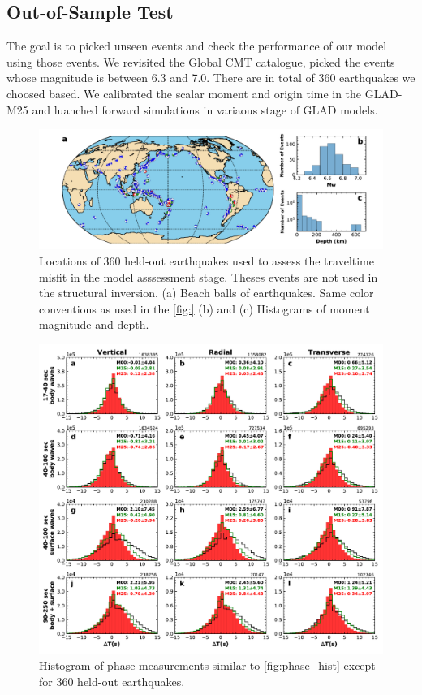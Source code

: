 \documentclass[extra,mreferee]{gji}
\begin{document}
\subsection{Out-of-Sample Test}

The goal is to picked unseen events and check the performance of our model using those events. We revisited the Global CMT catalogue, picked the events whose magnitude is between 6.3 and 7.0. There are in total of 360 earthquakes we choosed based. We calibrated the scalar moment and origin time in the GLAD-M25 and luanched forward simulations in variaous stage of GLAD models.

\begin{figure}
\includegraphics[width=\textwidth]{figures/events_360.pdf}
  \caption{Locations of 360 held-out earthquakes used to assess the traveltime misfit in the model asssessment stage. Theses events are not used in the structural inversion. (a) Beach balls of earthquakes. Same color conventions as used in the \ref{fig:} (b) and (c) Histograms of moment magnitude and depth.}
\centering
\end{figure}

\begin{figure}
\includegraphics[width=\textwidth]{figures/dt_histogram_360.pdf}
  \caption{Histogram of phase measurements similar to \ref{fig:phase_hist} except for 360 held-out earthquakes.}
\centering
\end{figure}
\end{document}
